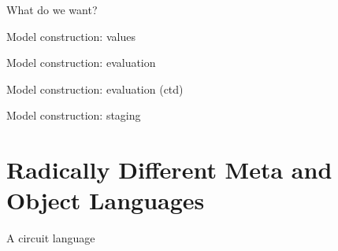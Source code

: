 \documentclass{beamer}
\begin{document}
\begin{frame}{What do we want?}
\end{frame}

\begin{frame}{Model construction: values}

  \begin{AgdaSuppressSpace}
  \end{AgdaSuppressSpace}
\end{frame}

\begin{frame}{Model construction: evaluation}
  \begin{AgdaSuppressSpace}
  \end{AgdaSuppressSpace}

  \begin{AgdaSuppressSpace}
  \end{AgdaSuppressSpace}
\end{frame}

\begin{frame}{Model construction: evaluation (ctd)}

  \bigskip

\end{frame}

\begin{frame}{Model construction: staging}
  \begin{AgdaSuppressSpace}
  \end{AgdaSuppressSpace}
\end{frame}

\section{Radically Different Meta and Object Languages}

\begin{frame}{A circuit language}
\end{frame}
\end{document}
